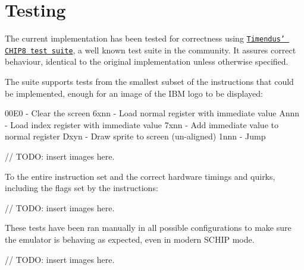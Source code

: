 \section{Testing}
\label{sec:ch3sec5}

\par The current implementation has been tested for correctness using \href{https://github.com/Timendus/chip8-test-suite}{\texttt{Timendus' CHIP8 test suite}}, a well known test suite in the community. It assures correct behaviour, identical to the original implementation unless otherwise specified. 

\par The suite supports tests from the smallest subset of the instructions that could be implemented, enough for an image of the IBM logo to be displayed:


    00E0 - Clear the screen
    6xnn - Load normal register with immediate value
    Annn - Load index register with immediate value
    7xnn - Add immediate value to normal register
    Dxyn - Draw sprite to screen (un-aligned)
    1nnn - Jump

// TODO: insert images here.

\par To the entire instruction set and the correct hardware timings and quirks, including the flags set by the instructions:

// TODO: insert images here.

\par These tests have been ran manually in all possible configurations to make sure the emulator is behaving as expected, even in modern SCHIP mode.

// TODO: insert images here.